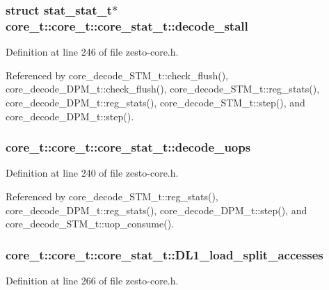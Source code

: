 \subsubsection[{decode\_\-stall}]{\setlength{\rightskip}{0pt plus 5cm}struct {\bf stat\_\-stat\_\-t}$\ast$ core\_\-t::core\_\-t::core\_\-stat\_\-t::decode\_\-stall\hspace{0.3cm}{\tt  [read]}}\label{structcore__t_1_1core__stat__t_06f7bf43ba230f7f8635332b06105b19}




Definition at line 246 of file zesto-core.h.

Referenced by core\_\-decode\_\-STM\_\-t::check\_\-flush(), core\_\-decode\_\-DPM\_\-t::check\_\-flush(), core\_\-decode\_\-STM\_\-t::reg\_\-stats(), core\_\-decode\_\-DPM\_\-t::reg\_\-stats(), core\_\-decode\_\-STM\_\-t::step(), and core\_\-decode\_\-DPM\_\-t::step().
\subsubsection[{decode\_\-uops}]{ core\_\-t::core\_\-t::core\_\-stat\_\-t::decode\_\-uops}\label{structcore__t_1_1core__stat__t_931aa6bb669ef3ec79d86380150e05ad}




Definition at line 240 of file zesto-core.h.

Referenced by core\_\-decode\_\-STM\_\-t::reg\_\-stats(), core\_\-decode\_\-DPM\_\-t::reg\_\-stats(), core\_\-decode\_\-DPM\_\-t::step(), and core\_\-decode\_\-STM\_\-t::uop\_\-consume().
\subsubsection[{DL1\_\-load\_\-split\_\-accesses}]{ core\_\-t::core\_\-t::core\_\-stat\_\-t::DL1\_\-load\_\-split\_\-accesses}\label{structcore__t_1_1core__stat__t_bb877e542f5f8d359cdf905408babf06}




Definition at line 266 of file zesto-core.h.

